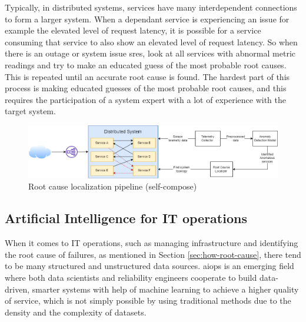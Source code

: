 Typically, in distributed systems, services have many interdependent connections to form a larger system. When a dependant service is experiencing an issue for example the elevated level of request latency, it is possible for a service consuming that service to also show an elevated level of request latency. So when there is an outage or system issue \acp{sre}, look at all services with abnormal metric readings and try to make an educated guess of the most probable root causes. This is repeated until an accurate root cause is found. The hardest part of this process is making educated guesses of the most probable root causes, and this requires the participation of a system expert with a lot of experience with the target system.

\begin{figure}[H]
    \includegraphics[width=16cm]{assets/literature-review/demo.png}
    \caption{Root cause localization pipeline (self-compose)}
\end{figure}

\subsection{Artificial Intelligence for IT operations}

When it comes to IT operations, such as managing infrastructure and identifying the root cause of failures, as mentioned in Section \ref{sec:how-root-cause}, there tend to be many structured and unstructured data sources. \ac{aiops} is an emerging field \citep{Artifici8:online} where both data scientists and reliability engineers cooperate to build data-driven, smarter systems with help of machine learning to achieve a higher quality of service, which is not simply possible by using traditional methods due to the density and the complexity of datasets.

